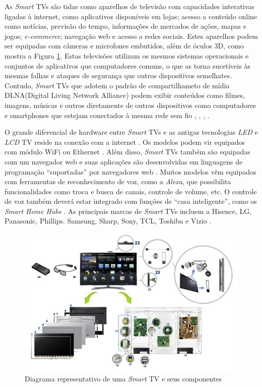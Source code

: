 
As \emph{Smart} TVs são tidas como aparelhos de televisão com capacidades interativas ligadas à internet, como aplicativos disponíveis em lojas; acesso a conteúdo online como notícias, previsão do tempo, informações de mercados de ações, mapas e jogos; \emph{e-commerce}; navegação web e acesso a redes sociais. Estes aparelhos podem ser equipadas com câmeras e microfones embutidos, além de óculos 3D, como mostra a Figura \ref{fig:smart_samsung}. Estas televisões utilizam os mesmos sistemas operacionais e conjuntos de aplicativos que computadores comuns, o que as torna sucetíveis às mesmas falhas e ataques de segurança que outros dispositivos semelhates. Contudo, \emph{Smart} TVs que adotem o padrão de compartilhameto de mídia DLNA(Digital Living Network Alliance) podem exibir conteúdos como filmes, imagens, músicas e outros diretamente de outros dispositivos como computadores e smartphones que estejam conectados à mesma rede sem fio \cite{michele2014watch}, \cite{shin2013smart}, \cite{perakakis2015proposed}, \cite{whatisasmarttv}.

O grande diferencial de hardware entre \emph{Smart} TVs e as antigas tecnologias \emph{LED} e \emph{LCD} TV reside na conexão com a internet \cite{differencebetween}. Os modelos podem vir equipados com módulo WiFi ou Ethernet \cite{tomsguid:everythingsmart}. Além disso, \emph{Smart} TVs também são equipadas com um navegador web e suas aplicações são desenvolvidas em linguagens de programação ``suportadas'' por navegadores web \cite{mautilus:specificationsforsmart}. Muitos modelos vêm equipados com ferramentas de reconhecimento de voz, como a \emph{Alexa}, que possibilita funcionalidades como troca e busca de canais, controle de volume, etc. O controle de voz também deverá estar integrado com funções de ``casa inteligente'', como os \emph{Smart Home Hubs} \cite{tomsguid:everythingsmart}. As principais marcas de \emph{Smart} TVs incluem a Hisence, LG, Panasonic, Phillips. Samsung, Sharp, Sony, TCL, Toshiba e Vizio \cite{tomsguid:everythingsmart}.


\begin{figure}[t]
	\includegraphics[width=\textwidth]{img/smart_samsung.jpg}
	\caption{Diagrama representativo de uma \emph{Smart} TV e seus componentes \cite{samsung:smarttv}}
	\label{fig:smart_samsung}
\end{figure}

